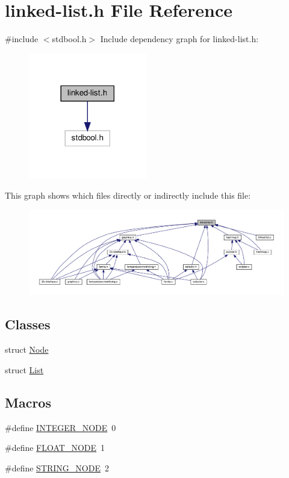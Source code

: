 \hypertarget{linked-list_8h}{}\section{linked-\/list.h File Reference}
\label{linked-list_8h}
{\ttfamily \#include $<$stdbool.\+h$>$}\newline
Include dependency graph for linked-\/list.h\+:
\nopagebreak
\begin{figure}[H]
\begin{center}
\leavevmode
\includegraphics[width=146pt]{linked-list_8h__incl}
\end{center}
\end{figure}
This graph shows which files directly or indirectly include this file\+:
\nopagebreak
\begin{figure}[H]
\begin{center}
\leavevmode
\includegraphics[width=350pt]{linked-list_8h__dep__incl}
\end{center}
\end{figure}
\subsection*{Classes}
\begin{DoxyCompactItemize}
\item 
struct \hyperlink{structNode}{Node}
\item 
struct \hyperlink{structList}{List}
\end{DoxyCompactItemize}
\subsection*{Macros}
\begin{DoxyCompactItemize}
\item 
\#define \hyperlink{linked-list_8h_a38009bdae1680b572de252ce6efc72e3}{I\+N\+T\+E\+G\+E\+R\+\_\+\+N\+O\+DE}~0
\item 
\#define \hyperlink{linked-list_8h_ac7657356b9d25f27a814e9e5d7ae3d72}{F\+L\+O\+A\+T\+\_\+\+N\+O\+DE}~1
\item 
\#define \hyperlink{linked-list_8h_a6b6ad317b09a9ef8f68619bf862289d6}{S\+T\+R\+I\+N\+G\+\_\+\+N\+O\+DE}~2
\end{DoxyCompactItemize}
